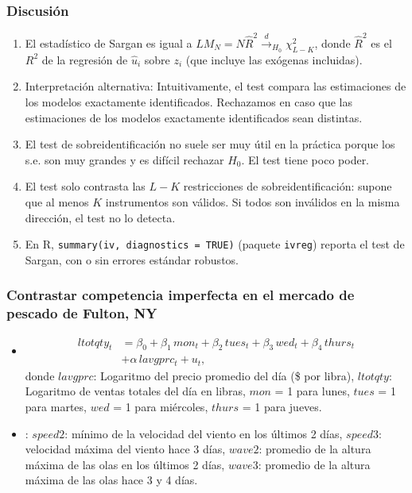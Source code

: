 \documentclass[t, compress, spanish, aspectratio=169]{beamer}
\newcommand{\term}[1]{\structure{\textbf{#1}}} %
\newcommand{\dto}{\stackrel{d}{\longrightarrow}}
\begin{document}
\begin{frame}
    \frametitle{Discusi\'on}
    \small
    \begin{enumerate} [<+->]
        \item El estad\'istico de Sargan es igual a $LM_N=N\hat R^2\dto_{H_0} \chi^2_{L-K}$, donde $\hat R^2$ es el $R^2$ de la regresi\'on de $\hat u_i$ sobre $z_i$ (que incluye las ex\'ogenas incluidas).
        \item Interpretaci\'on alternativa: Intuitivamente, el test compara las estimaciones de los modelos exactamente identificados. Rechazamos en caso que las estimaciones de los modelos exactamente identificados sean distintas.
        \item  El test de sobreidentificaci\'on no suele ser muy \'util en la pr\'actica porque los s.e. son muy grandes y es dif\'icil rechazar $H_0$. El test tiene poco poder.
        \item El test solo contrasta las $L-K$ restricciones de sobreidentificaci\'on: supone que al menos $K$ instrumentos son v\'alidos. Si todos son inv\'alidos en la misma direcci\'on, el test no lo detecta.
        \item En R, \texttt{summary(iv, diagnostics = TRUE)} (paquete \texttt{ivreg}) reporta el test de Sargan, con o sin errores est\'andar robustos.
    \end{enumerate}
\end{frame}
\begin{frame}
	\frametitle{Contrastar competencia imperfecta en el mercado de pescado de Fulton, NY}
	\begin{itemize}
		\item \term{Modelo}
		\begin{align*}
		ltotqty_t&= \beta_0+\beta_1\, mon_t+\beta_2 \,tues_t+\beta_3\, wed_t+\beta_4 \,thurs_t\\
		&+\alpha \, lavgprc_t +u_t,
		\end{align*}
		donde $lavgprc$: Logaritmo del precio promedio del d\'ia (\$ por libra), $ltotqty$: Logaritmo de ventas totales del d\'ia en libras, $mon$ = 1 para lunes, $tues$ = 1 para martes, $wed$ = 1 para mi\'ercoles, $thurs$ = 1 para jueves.
		\item \term{Instrumentos}: $speed2$: m\'inimo de la velocidad del viento en los \'ultimos 2 d\'ias, $speed3$: velocidad m\'axima del viento hace 3 d\'ias, $wave2$: promedio de la altura m\'axima de las olas en los \'ultimos 2 d\'ias, $wave3$: promedio de la altura m\'axima de las olas hace 3 y 4 d\'ias.
	\end{itemize}
\end{frame}
\end{document}
